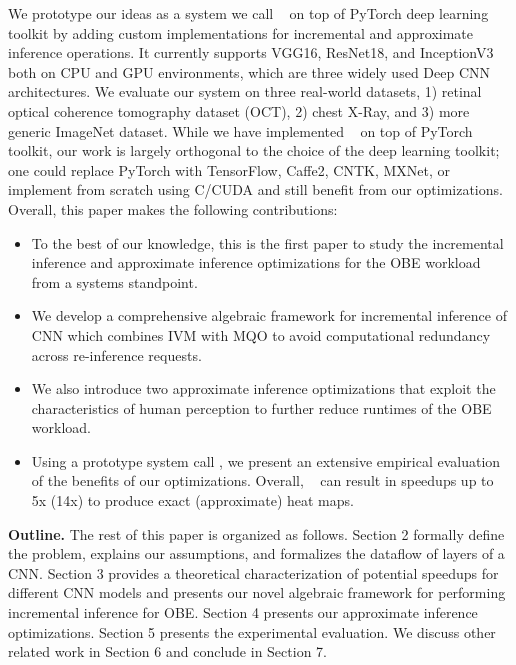 We prototype our ideas as a system we call \system~ on top of PyTorch deep learning toolkit by adding custom implementations for incremental and approximate inference operations.
It currently supports VGG16, ResNet18, and InceptionV3 both on CPU and GPU environments, which are three widely used Deep CNN architectures.
We evaluate our system on three real-world datasets, 1) retinal optical coherence tomography dataset (OCT), 2) chest X-Ray, and 3) more generic ImageNet dataset.
While we have implemented \system~ on top of PyTorch toolkit, our work is largely orthogonal to the choice of the deep learning toolkit; one could replace PyTorch with TensorFlow, Caffe2, CNTK, MXNet, or implement from scratch using C/CUDA and still benefit from our optimizations.
Overall, this paper makes the following contributions:

\begin{itemize}
	\item To the best of our knowledge, this is the first paper to study the incremental inference and approximate inference optimizations for the OBE workload from a systems standpoint.

	\item We develop a comprehensive algebraic framework for incremental inference of CNN which combines IVM with MQO to avoid computational redundancy across re-inference requests.

	\item We also introduce two approximate inference optimizations that exploit the characteristics of human perception to further reduce runtimes of the OBE workload.

	\item Using a prototype system call \system, we present an extensive empirical evaluation of the benefits of our optimizations. Overall, \system~  can result in speedups up to 5x (14x) to produce exact (approximate) heat maps.

\end{itemize}

\vspace{2mm}
\noindent \textbf{Outline.} The rest of this paper is organized as follows.
Section 2 formally define the problem, explains our assumptions, and formalizes the dataflow of layers of a CNN.
Section 3 provides a theoretical characterization of potential speedups for different CNN models and presents our novel algebraic framework for performing incremental inference for OBE.
Section 4 presents our approximate inference optimizations.
Section 5 presents the experimental evaluation.
We discuss other related work in Section 6 and conclude in Section 7.
